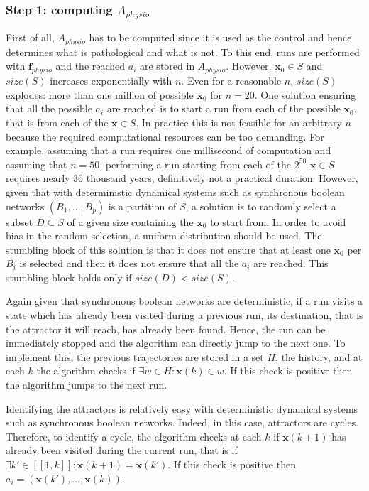 \documentclass[oneside,a4paper,onecolumn,notitlepage]{article}
\begin{document}
\subsubsection{Step 1: computing $A_{physio}$}
First of all, $A_{physio}$ has to be computed since it is used as the control and hence determines what is pathological and what is not. To this end, runs are performed with $\boldsymbol{f}_{physio}$ and the reached $a_i$ are stored in $A_{physio}$. However, $\boldsymbol{x}_0\in S$ and $size(S)$ increases exponentially with $n$. Even for a reasonable $n$, $size(S)$ explodes: more than one million of possible $\boldsymbol{x}_0$ for $n=20$. One solution ensuring that all the possible $a_i$ are reached is to start a run from each of the possible $\boldsymbol{x}_0$, that is from each of the $\boldsymbol{x}\in S$. In practice this is not feasible for an arbitrary $n$ because the required computational resources can be too demanding. For example, assuming that a run requires one millisecond of computation and assuming that $n=50$, performing a run starting from each of the $2^{50}$ $\boldsymbol{x}\in S$ requires nearly 36 thousand years, definitively not a practical duration. However, given that with deterministic dynamical systems such as synchronous boolean networks $(B_1,\dots,B_p)$ is a partition of $S$, a solution is to randomly select a subset $D\subseteq S$ of a given size containing the $\boldsymbol{x}_0$ to start from. In order to avoid bias in the random selection, a uniform distribution should be used. The stumbling block of this solution is that it does not ensure that at least one $\boldsymbol{x}_0$ per $B_i$ is selected and then it does not ensure that all the $a_i$ are reached. This stumbling block holds only if $size(D)<size(S)$.

Again given that synchronous boolean networks are deterministic, if a run visits a state which has already been visited during a previous run, its destination, that is the attractor it will reach, has already been found. Hence, the run can be immediately stopped and the algorithm can directly jump to the next one. To implement this, the previous trajectories are stored in a set $H$, the history, and at each $k$ the algorithm checks if $\exists w\in H: \boldsymbol{x}(k)\in w$. If this check is positive then the algorithm jumps to the next run.

Identifying the attractors is relatively easy with deterministic dynamical systems such as synchronous boolean networks. Indeed, in this case, attractors are cycles. Therefore, to identify a cycle, the algorithm checks at each $k$ if $\boldsymbol{x}(k+1)$ has already been visited during the current run, that is if $\exists k'\in [\![1,k]\!]: \boldsymbol{x}(k+1)=\boldsymbol{x}(k')$. If this check is positive then $a_i=(\boldsymbol{x}(k'),\dots ,\boldsymbol{x}(k))$.
\end{document}
